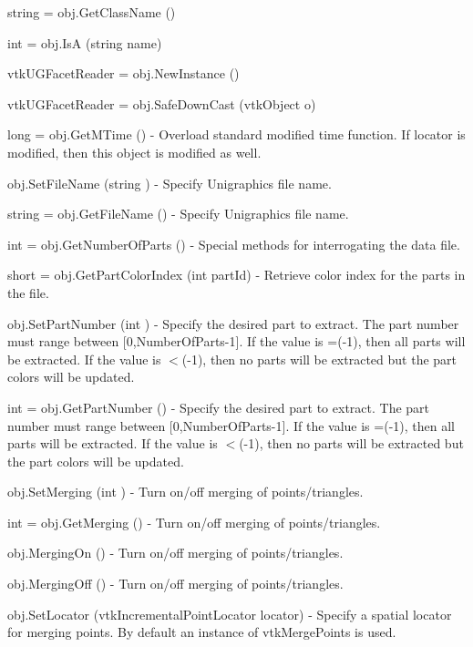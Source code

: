 \begin{DoxyItemize}
\item {\ttfamily string = obj.\-Get\-Class\-Name ()}  
\item {\ttfamily int = obj.\-Is\-A (string name)}  
\item {\ttfamily vtk\-U\-G\-Facet\-Reader = obj.\-New\-Instance ()}  
\item {\ttfamily vtk\-U\-G\-Facet\-Reader = obj.\-Safe\-Down\-Cast (vtk\-Object o)}  
\item {\ttfamily long = obj.\-Get\-M\-Time ()} -\/ Overload standard modified time function. If locator is modified, then this object is modified as well.  
\item {\ttfamily obj.\-Set\-File\-Name (string )} -\/ Specify Unigraphics file name.  
\item {\ttfamily string = obj.\-Get\-File\-Name ()} -\/ Specify Unigraphics file name.  
\item {\ttfamily int = obj.\-Get\-Number\-Of\-Parts ()} -\/ Special methods for interrogating the data file.  
\item {\ttfamily short = obj.\-Get\-Part\-Color\-Index (int part\-Id)} -\/ Retrieve color index for the parts in the file.  
\item {\ttfamily obj.\-Set\-Part\-Number (int )} -\/ Specify the desired part to extract. The part number must range between \mbox{[}0,Number\-Of\-Parts-\/1\mbox{]}. If the value is =(-\/1), then all parts will be extracted. If the value is $<$(-\/1), then no parts will be extracted but the part colors will be updated.  
\item {\ttfamily int = obj.\-Get\-Part\-Number ()} -\/ Specify the desired part to extract. The part number must range between \mbox{[}0,Number\-Of\-Parts-\/1\mbox{]}. If the value is =(-\/1), then all parts will be extracted. If the value is $<$(-\/1), then no parts will be extracted but the part colors will be updated.  
\item {\ttfamily obj.\-Set\-Merging (int )} -\/ Turn on/off merging of points/triangles.  
\item {\ttfamily int = obj.\-Get\-Merging ()} -\/ Turn on/off merging of points/triangles.  
\item {\ttfamily obj.\-Merging\-On ()} -\/ Turn on/off merging of points/triangles.  
\item {\ttfamily obj.\-Merging\-Off ()} -\/ Turn on/off merging of points/triangles.  
\item {\ttfamily obj.\-Set\-Locator (vtk\-Incremental\-Point\-Locator locator)} -\/ Specify a spatial locator for merging points. By default an instance of vtk\-Merge\-Points is used.  

\end{DoxyItemize}
